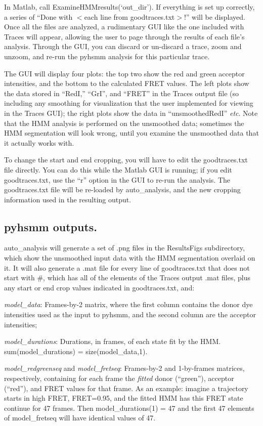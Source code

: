 \documentclass[11pt]{article}
\begin{document}
In Matlab, call ExamineHMMresults(`out\_dir'). If everything is set up correctly, a series of ``Done with $<$each line from goodtraces.txt$>$!'' will be displayed. Once all the files are analyzed, a rudimentary GUI like the one included with Traces will appear, allowing the user to page through the results of each file's analysis. Through the GUI, you can discard or un-discard a trace, zoom and unzoom, and re-run the pyhsmm analysis for this particular trace.

The GUI will display four plots: the top two show the red and green acceptor intensities, and the bottom to the calculated FRET values. The left plots show the data stored in ``RedI,'' ``GrI'', and ``FRET'' in the Traces output file (so including any smoothing for visualization that the user implemented for viewing in the Traces GUI); the right plots show the data in ``unsmoothedRedI'' {\it etc}. Note that the HMM analysis is performed on the unsmoothed data; sometimes the HMM segmentation will look wrong, until you examine the unsmoothed data that it actually works with.

To change the start and end cropping, you will have to edit the goodtraces.txt file directly. You can do this while the Matlab GUI is running; if you edit goodtraces.txt, use the ``r'' option in the GUI to re-run the analysis. The goodtraces.txt file will be re-loaded by auto\_analysis, and the new cropping information used in the resulting output.


\subsection{pyhsmm outputs.}

auto\_analysis will generate a set of .png files in the ResultsFigs subdirectory, which show the unsmoothed input data with the HMM segmentation overlaid on it. It will also generate a .mat file for every line of goodtraces.txt that does not start with \#, which has all of the elements of the Traces output .mat files, plus any start or end crop values indicated in goodtraces.txt, and:

{\it model\_data}: Frames-by-2 matrix, where the first column contains the donor dye intensities used as the input to pyhsmm, and the second column are the acceptor intensities;

{\it model\_durations}: Durations, in frames, of each state fit by the HMM. sum(model\_durations) = size(model\_data,1).

{\it model\_redgreenseq} and {\it model\_fretseq}: Frames-by-2 and 1-by-frames matrices, respectively, containing for each frame the {\it fitted} donor (``green''), acceptor (``red''), and FRET values for that frame. As an example: imagine a trajectory starts in high FRET, FRET=0.95, and the fitted HMM has this FRET state continue for 47 frames. Then model\_durations(1) = 47 and the first 47 elements of model\_fretseq will have identical values of 47.
\end{document}
